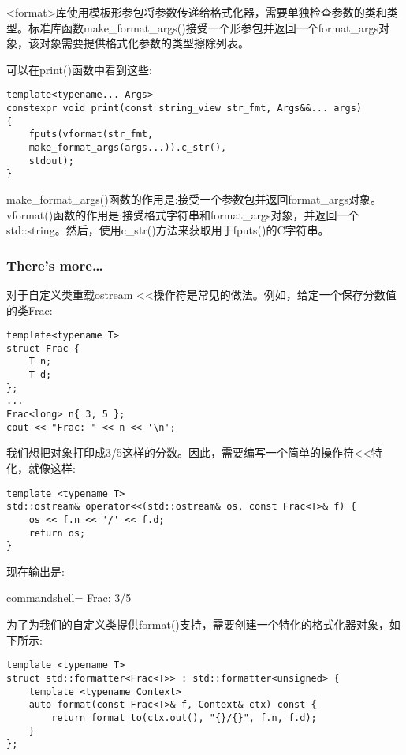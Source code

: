 <format>库使用模板形参包将参数传递给格式化器，需要单独检查参数的类和类型。标准库函数make\_format\_args()接受一个形参包并返回一个format\_args对象，该对象需要提供格式化参数的类型擦除列表。

可以在print()函数中看到这些:

\begin{lstlisting}[style=styleCXX]
template<typename... Args>
constexpr void print(const string_view str_fmt, Args&&... args)
{
	fputs(vformat(str_fmt,
	make_format_args(args...)).c_str(),
	stdout);
}
\end{lstlisting}

make\_format\_args()函数的作用是:接受一个参数包并返回format\_args对象。vformat()函数的作用是:接受格式字符串和format\_args对象，并返回一个std::string。然后，使用c\_str()方法来获取用于fputs()的C字符串。

\subsubsection{There's more…}

对于自定义类重载ostream <{}<操作符是常见的做法。例如，给定一个保存分数值的类Frac:

\begin{lstlisting}[style=styleCXX]
template<typename T>
struct Frac {
	T n;
	T d;
};
...
Frac<long> n{ 3, 5 };
cout << "Frac: " << n << '\n';
\end{lstlisting}

我们想把对象打印成3/5这样的分数。因此，需要编写一个简单的操作符<{}<特化，就像这样:

\begin{lstlisting}[style=styleCXX]
template <typename T>
std::ostream& operator<<(std::ostream& os, const Frac<T>& f) {
	os << f.n << '/' << f.d;
	return os;
}
\end{lstlisting}

现在输出是:

\begin{tcblisting}{commandshell={}}
Frac: 3/5
\end{tcblisting}

为了为我们的自定义类提供format()支持，需要创建一个特化的格式化器对象，如下所示:

\begin{lstlisting}[style=styleCXX]
template <typename T>
struct std::formatter<Frac<T>> : std::formatter<unsigned> {
	template <typename Context>
	auto format(const Frac<T>& f, Context& ctx) const {
		return format_to(ctx.out(), "{}/{}", f.n, f.d);
	}
};
\end{lstlisting}

